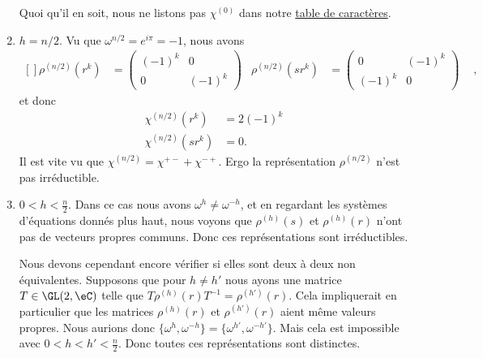 \begin{enumerate}
	      Quoi qu'il en soit, nous ne listons pas \( \chi^{(0)}\) dans notre \href{http://fr.wikipedia.org/wiki/Aide:Unicode}{table de caractères}.

	\item
	      \( h=n/2\). Vu que \( \omega^{n/2}= e^{i\pi}=-1\), nous avons
	      \begin{equation}
		      \begin{aligned}[]
			      \rho^{(n/2)}(r^k)  & =\begin{pmatrix}
				                            (-1)^k & 0      \\
				                            0      & (-1)^k
			                            \end{pmatrix} &
			      \rho^{(n/2)}(sr^k) & =\begin{pmatrix}
				                            0      & (-1)^k \\
				                            (-1)^k & 0
			                            \end{pmatrix} &
		      \end{aligned},
	      \end{equation}
	      et donc
	      \begin{subequations}
		      \begin{align}
			      \chi^{(n/2)}(r^k)  & =2(-1)^k \\
			      \chi^{(n/2)}(sr^k) & =0.
		      \end{align}
	      \end{subequations}
	      Il est vite vu que \( \chi^{(n/2)}=\chi^{+-}+\chi^{-+}\). Ergo la représentation \( \rho^{(n/2)}\) n'est pas irréductible.

	\item
	      \( 0<h<\frac{ n }{2}\). Dans ce cas nous avons \( \omega^h\neq \omega^{-h}\), et en regardant les systèmes d'équations donnés plus haut, nous voyons que \( \rho^{(h)}(s)\) et \( \rho^{(h)}(r)\) n'ont pas de vecteurs propres communs. Donc ces représentations sont irréductibles.

	      Nous devons cependant encore vérifier si elles sont deux à deux non équivalentes. Supposons que pour \( h\neq h'\) nous ayons une matrice \( T\in \GL(2,\eC)\) telle que \( T\rho^{(h)}(r)T^{-1}=\rho^{(h')}(r)\). Cela impliquerait en particulier que les matrices \( \rho^{(h)}(r)\) et \( \rho^{(h')}(r)\) aient même valeurs propres. Nous aurions donc \( \{ \omega^h,\omega^{-h} \}=\{ \omega^{h'},\omega^{-h'} \}\). Mais cela est impossible avec \( 0<h<h'<\frac{ n }{2}\). Donc toutes ces représentations sont distinctes.

\end{enumerate}

